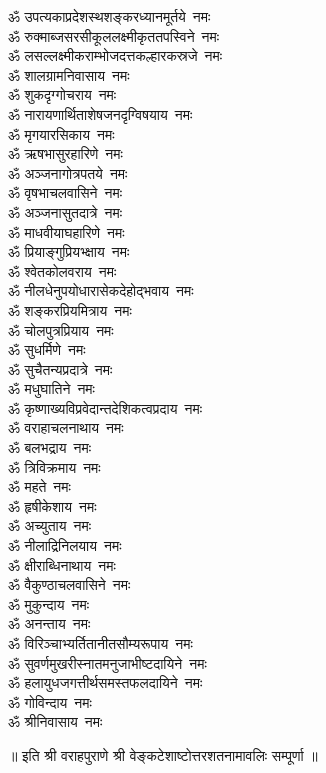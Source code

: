 \begin{multicols}{2}
\begin{flushleft}
ॐ उपत्यकाप्रदेशस्थशङ्कर\-ध्यानमूर्तये~नमः\\
ॐ रुक्माब्जसरसीकूललक्ष्मीकृत\-तपस्विने~नमः\\
ॐ लसल्लक्ष्मीकराम्भोजदत्त\-कल्हारकस्रजे~नमः\\
ॐ शालग्रामनिवासाय~नमः\\
ॐ शुकदृग्गोचराय~नमः\\
ॐ नारायणार्थिताशेषजन\-दृग्विषयाय~नमः\\
ॐ मृगयारसिकाय~नमः\\
ॐ ऋषभासुरहारिणे~नमः\hfill{}\\
ॐ अञ्जनागोत्रपतये~नमः\\
ॐ वृषभाचलवासिने~नमः\\
ॐ अञ्जनासुतदात्रे~नमः\\
ॐ माधवीयाघहारिणे~नमः\\
ॐ प्रियाङ्गुप्रियभ्क्षाय~नमः\\
ॐ श्वेतकोलवराय~नमः\\
ॐ नीलधेनुपयोधारासेक\-देहोद्भवाय~नमः\\
ॐ शङ्करप्रियमित्राय~नमः\\
ॐ चोलपुत्रप्रियाय~नमः\\
ॐ सुधर्मिणे~नमः\hfill{}\\
ॐ सुचैतन्यप्रदात्रे~नमः\\
ॐ मधुघातिने~नमः\\
ॐ कृष्णाख्यविप्रवेदान्त\-देशिकत्व\-प्रदाय~नमः\\
ॐ वराहाचलनाथाय~नमः\\
ॐ बलभद्राय~नमः\\
ॐ त्रिविक्रमाय~नमः\\
ॐ महते~नमः\\
ॐ हृषीकेशाय~नमः\\
ॐ अच्युताय~नमः\\
ॐ नीलाद्रिनिलयाय~नमः\hfill{}\\
ॐ क्षीराब्धिनाथाय~नमः\\
ॐ वैकुण्ठाचलवासिने~नमः\\
ॐ मुकुन्दाय~नमः\\
ॐ अनन्ताय~नमः\\
ॐ विरिञ्चाभ्यर्तितानीत\-सौम्य\-रूपाय~नमः\\
ॐ सुवर्णमुखरीस्नातमनुजाभीष्ट\-दायिने~नमः\\
ॐ हलायुधजगत्तीर्थसमस्त\-फलदायिने~नमः\\
ॐ गोविन्दाय~नमः\\
ॐ श्रीनिवासाय~नमः\\
\end{flushleft}
\end{multicols}
\centerline{॥ इति श्री वराहपुराणे श्री वेङ्कटेशाष्टोत्तरशतनामावलिः सम्पूर्णा ॥}
